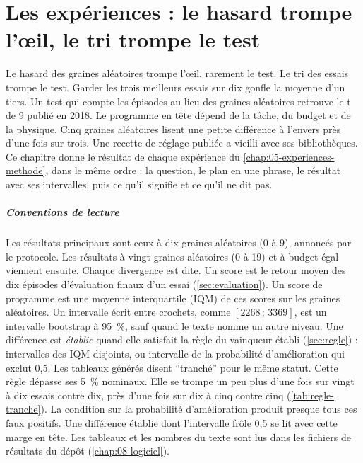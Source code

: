 \chapter{Les expériences : le hasard trompe l'œil, le tri trompe le test}\label{chap:06-experiences-resultats}

Le hasard des graines aléatoires trompe l'œil, rarement le test. Le tri des essais trompe le test. Garder
les trois meilleurs essais sur dix gonfle la moyenne d'un tiers. Un test qui compte les épisodes au lieu des
graines aléatoires retrouve le t de 9 publié en 2018. Le programme en tête dépend de la tâche, du budget et de
la physique. Cinq graines aléatoires lisent une petite différence à l'envers près d'une fois sur trois.
Une recette de réglage publiée a vieilli avec ses bibliothèques. Ce chapitre donne le résultat de chaque
expérience du \cref{chap:05-experiences-methode}, dans le même ordre : la question, le plan en une phrase, le
résultat avec ses intervalles, puis ce qu'il signifie et ce qu'il ne dit pas.

\paragraph{Conventions de lecture}
Les résultats principaux sont ceux à dix graines aléatoires (0 à 9), annoncés par le protocole. Les
résultats à vingt graines aléatoires (0 à 19) et à budget égal viennent ensuite. Chaque divergence est dite. Un score
est le retour moyen des dix épisodes d'évaluation finaux d'un essai (\cref{sec:evaluation}). Un score de
programme est une moyenne interquartile (IQM) de ces scores sur les graines aléatoires. Un intervalle écrit
entre crochets, comme $[\num{2268}\,;\,\num{3369}]$, est un intervalle bootstrap à 95~\%, sauf quand le texte
nomme un autre niveau. Une différence est
\emph{établie} quand elle satisfait la règle du vainqueur établi (\cref{sec:regle}) : intervalles des IQM
disjoints, ou intervalle de la probabilité d'amélioration qui exclut 0,5. Les tableaux générés disent
\enquote{tranché} pour le même statut. Cette règle dépasse ses 5~\% nominaux. Elle se trompe un peu plus
d'une fois sur vingt à dix essais contre dix, près d'une fois sur dix à cinq contre cinq
(\cref{tab:regle-tranche}). La condition sur la probabilité d'amélioration produit presque
tous ces faux positifs. Une différence établie dont l'intervalle frôle 0,5 se lit avec cette marge en tête. Les tableaux et les
nombres du texte sont lus dans les fichiers de résultats du dépôt (\cref{chap:08-logiciel}).

